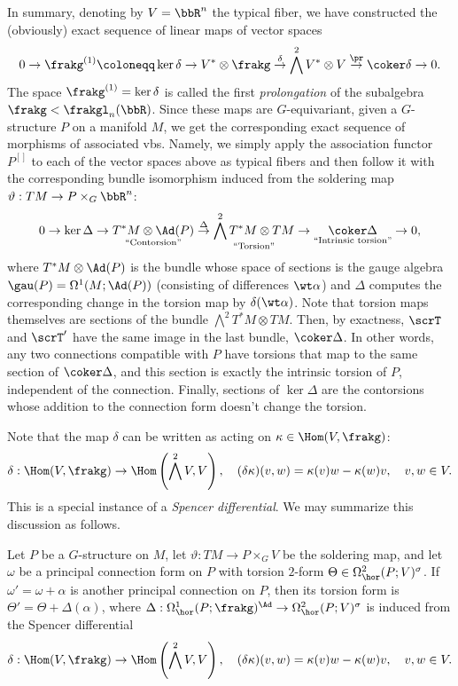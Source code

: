 In summary, denoting by $V=\bbR^n$ the typical fiber, we have constructed the (obviously) exact sequence of linear maps of vector spaces
\[0\to\frakg^{(1)}\coloneqq\ker\delta\to V^\ast\otimes\frakg\overset{\delta}{\to}\bigwedge^2 V^\ast \otimes V\overset{\pr}{\to}\coker\delta\to 0.\]
The space $\frakg^{(1)}=\ker\delta$ is called the first \emph{prolongation} of the subalgebra $\frakg<\frakgl_n(\bbR)$. Since these maps are $G$-equivariant, given a $G$-structure $P$ on a manifold $M$, we get the corresponding exact sequence of morphisms of associated \glspl{vb}. Namely, we simply apply the association functor $P^{[]}$ to each of the vector spaces above as typical fibers and then follow it with the corresponding bundle isomorphism induced from the soldering map $\vartheta:TM\to P\times_G \bbR^n$:
\[ 0\to \ker \Delta \to \underset{\text{``Contorsion''}}{T^\ast M\otimes \Ad(P)}\overset{\Delta}{\to} \underset{\text{``Torsion''}}{\bigwedge^2 T^\ast M\otimes TM}\to \underset{\text{``Intrinsic torsion''}}{\coker \Delta}\to 0,\]
where $ T^\ast M\otimes \Ad(P)$ is the bundle whose space of sections is the gauge algebra $\gau(P)=\Omega^1(M;\Ad(P))$ (consisting of differences $\wt\alpha$) and $\Delta$ computes  the corresponding change in the torsion map by $\delta(\wt\alpha)$. Note that torsion maps themselves are sections of the bundle $\bigwedge^2 T^\ast M\otimes TM$. Then, by exactness, $\scrT$ and $\scrT'$ have the same image in the last bundle, $\coker\Delta$. In other words, any two connections compatible with $P$ have torsions that map to the same section of $\coker\Delta$, and this section is exactly the intrinsic torsion of $P$, independent of the connection. Finally, sections of $\ker\Delta$ are the contorsions whose addition to the connection form doesn't change the torsion.

Note that the map $\delta$ can be written as acting on $\kappa\in\Hom(V,\frakg)$:
\[\delta:\Hom(V,\frakg)\to \Hom\left(\bigwedge^2 V,V\right),\quad (\delta\kappa)(v,w)=\kappa(v) w-\kappa(w) v,\quad v,w\in V.\]
This is a special instance  of a \emph{Spencer differential}. We may summarize this discussion as follows.

\begin{prop}
    Let $P$ be a $G$-structure on $M$, let $\vartheta:TM\to P\times_G V$ be the soldering map, and let $\omega$ be a principal connection form on $P$ with torsion $2$-form $\Theta\in\Omega^2_{\hor}(P;V)^\sigma$. If $\omega'=\omega+\alpha$ is another principal connection on $P$, then its torsion form is $\Theta'=\Theta+\Delta(\alpha)$, where $\Delta:\Omega^1_{\hor}(P;\frakg)^\Ad\to \Omega^2_{\hor}(P;V)^\sigma$ is induced from the Spencer differential 
    \[\delta:\Hom(V,\frakg)\to \Hom\left(\bigwedge^2 V,V\right),\quad (\delta\kappa) (v,w)=\kappa(v)w-\kappa(w)v,\quad v,w\in V.\]
\end{prop}


